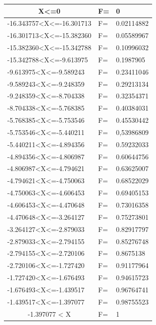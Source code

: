 \begin{table}[!h]
\centering
\label{my-label}
\begin{tabular}{|l|l|l|}
\hline
\multicolumn{1}{|c|}{X\textless=0}         & F= & 0          \\ \hline
-16.343757\textless X\textless=-16.301713  & F= & 0.02114882 \\ \hline
-16.301713\textless X\textless=-15.382360  & F= & 0.05589967 \\ \hline
-15.382360\textless X\textless=-15.342788  & F= & 0.10996032 \\ \hline
-15.342788\textless X\textless=-9.613975   & F= & 0.1987905  \\ \hline
-9.613975\textless X\textless=-9.589243    & F= & 0.23411046 \\ \hline
-9.589243\textless X\textless=-9.248359    & F= & 0.29213134 \\ \hline
-9.248359\textless X\textless=-8.704338    & F= & 0.32354371 \\ \hline
-8.704338\textless X\textless=-5.768385    & F= & 0.40384031 \\ \hline
-5.768385\textless X\textless=-5.753546    & F= & 0.45530442 \\ \hline
-5.753546\textless X\textless=-5.440211    & F= & 0,53986809 \\ \hline
-5.440211\textless X\textless=-4.894356    & F= & 0.59232033 \\ \hline
-4.894356\textless X\textless=-4.806987    & F= & 0.60644756 \\ \hline
-4.806987\textless X\textless=-4.794621    & F= & 0.63625007 \\ \hline
-4.794621\textless X\textless=-4.750063    & F= & 0.68522029 \\ \hline
-4.750063\textless X\textless=-4.606453    & F= & 0.69405153 \\ \hline
-4.606453\textless X\textless=-4.470648    & F= & 0.73016358 \\ \hline
-4.470648\textless X\textless=-3.264127    & F= & 0.75273801 \\ \hline
-3.264127\textless X\textless=-2.879033    & F= & 0.82917797 \\ \hline
-2.879033\textless X\textless=-2.794155    & F= & 0.85276748 \\ \hline
-2.794155\textless X\textless=-2.720106    & F= & 0.8675138  \\ \hline
-2.720106\textless X\textless=-1.727420    & F= & 0.91177964 \\ \hline
-1.727420\textless X\textless=-1.676493    & F= & 0.94615723 \\ \hline
-1.676493\textless X\textless=-1.439517    & F= & 0.96764741 \\ \hline
-1.439517\textless X\textless=-1.397077    & F= & 0.98755523 \\ \hline
\multicolumn{1}{|c|}{-1.397077 < X} & F= & 1          \\ \hline
\end{tabular}
\end{table}
